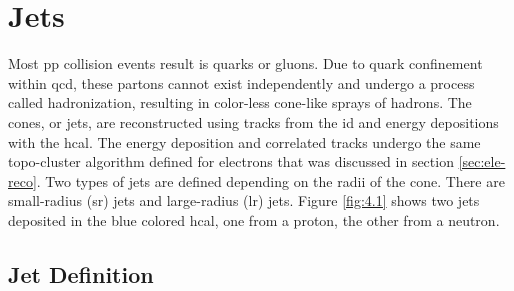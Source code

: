 \section{Jets}

Most \gls{pp} collision events result is quarks or gluons. Due to quark confinement within \gls{qcd}, these partons cannot exist independently and undergo 
a process called hadronization, resulting in color-less cone-like sprays of hadrons. The cones, or jets, are reconstructed using tracks from the \gls{id} and energy 
depositions with the \gls{hcal}. The energy deposition and correlated tracks undergo the same topo-cluster algorithm defined for electrons that was discussed in section \ref{sec:ele-reco}.
Two types of jets are defined depending on the radii of the cone. There are small-radius (\gls{sr}) jets and large-radius (\gls{lr}) jets.
Figure \ref{fig:4.1} shows two jets deposited in the blue colored \gls{hcal}, one from a proton, the other from a neutron. 

\subsection{Jet Definition}\label{sec:jet-def}

